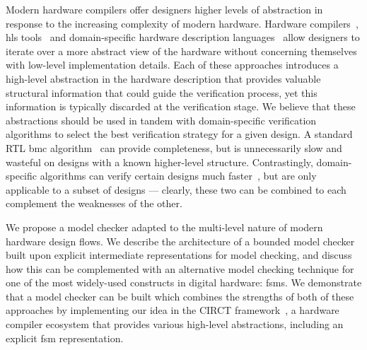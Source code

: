 \documentclass[acmsmall,screen,review]{acmart}
\begin{document}
Modern hardware compilers offer designers higher levels of abstraction in response to the increasing complexity of modern hardware.
Hardware compilers~\cite{calyx, mlir_circt}, \ac{hls} tools~\cite{xilinx_hls, heterohalide, halide_hls, zhang2024optimizing} and domain-specific hardware description languages~\cite{hlhdl, dahlia, chen2024allo} allow designers to iterate over a more abstract view of the hardware without concerning themselves with low-level implementation details.
Each of these approaches introduces a high-level abstraction in the hardware description that provides valuable structural information that could guide the verification process, yet this information is typically discarded at the verification stage.
We believe that these abstractions should be used in tandem with domain-specific verification algorithms to select the best verification strategy for a given design.
A standard RTL \ac{bmc} algorithm~\cite{bmc_found_1} can provide completeness, but is unnecessarily slow and wasteful on designs with a known higher-level structure.
Contrastingly, domain-specific algorithms can verify certain designs much faster~\cite{bogor, cascading_verification}, but are only applicable to a subset of designs --- clearly, these two can be combined to each complement the weaknesses of the other.

We propose a model checker adapted to the multi-level nature of modern hardware design flows.
We describe the architecture of a bounded model checker built upon explicit intermediate representations for model checking, and discuss how this can be complemented with an alternative model checking technique for one of the most widely-used constructs in digital hardware: \acp{fsm}.
We demonstrate that a model checker can be built which combines the strengths of both of these approaches by implementing our idea in the CIRCT framework~\cite{CIRCT}, a hardware compiler ecosystem that provides various high-level abstractions, including an explicit \ac{fsm} representation.
\end{document}
